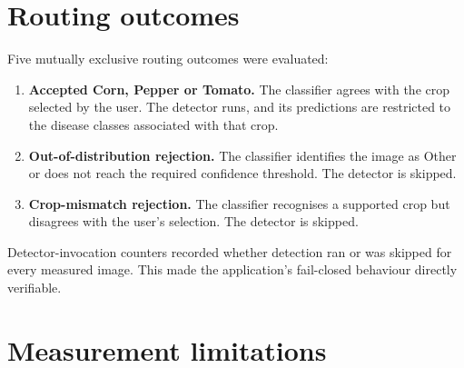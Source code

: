 \documentclass[preprint,12pt,authoryear]{elsarticle}
\begin{document}
\section{Routing outcomes}
\label{sup:routing}

Five mutually exclusive routing outcomes were evaluated:

\begin{enumerate}
  \item \textbf{Accepted Corn, Pepper or Tomato.} The classifier agrees with
  the crop selected by the user. The detector runs, and its predictions are
  restricted to the disease classes associated with that crop.

  \item \textbf{Out-of-distribution rejection.} The classifier identifies the
  image as Other or does not reach the required confidence threshold. The
  detector is skipped.

  \item \textbf{Crop-mismatch rejection.} The classifier recognises a
  supported crop but disagrees with the user's selection. The detector is
  skipped.
\end{enumerate}

Detector-invocation counters recorded whether detection ran or was skipped for
every measured image. This made the application's fail-closed behaviour
directly verifiable.

\section{Measurement limitations}
\label{sup:limitations}
\end{document}
